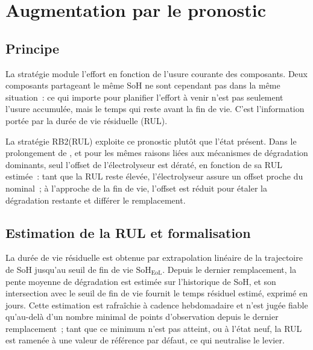 
\section{Augmentation par le pronostic}
\label{sec:rul_aware}

\subsection{Principe}

La stratégie \RBsohH{} module l'effort en fonction de l'usure courante des composants. Deux composants partageant le même SoH ne sont cependant pas dans la même situation~: ce qui importe pour planifier l'effort à venir n'est pas seulement l'usure accumulée, mais le temps qui reste avant la fin de vie. C'est l'information portée par la durée de vie résiduelle (RUL).

La stratégie RB2(RUL) exploite ce pronostic plutôt que l'état présent. Dans le prolongement de \RBsohH, et pour les mêmes raisons liées aux mécanismes de dégradation dominants, seul l'offset de l'électrolyseur est dératé, en fonction de sa RUL estimée~: tant que la RUL reste élevée, l'électrolyseur assure un offset proche du nominal~; à l'approche de la fin de vie, l'offset est réduit pour étaler la dégradation restante et différer le remplacement.

\subsection{Estimation de la RUL et formalisation}

La durée de vie résiduelle est obtenue par extrapolation linéaire de la trajectoire de SoH jusqu'au seuil de fin de vie $\mathrm{SoH}_{\text{EoL}}$. Depuis le dernier remplacement, la pente moyenne de dégradation est estimée sur l'historique de SoH, et son intersection avec le seuil de fin de vie fournit le temps résiduel estimé, exprimé en jours. Cette estimation est rafraîchie à cadence hebdomadaire et n'est jugée fiable qu'au-delà d'un nombre minimal de points d'observation depuis le dernier remplacement~; tant que ce minimum n'est pas atteint, ou à l'état neuf, la RUL est ramenée à une valeur de référence par défaut, ce qui neutralise le levier.

